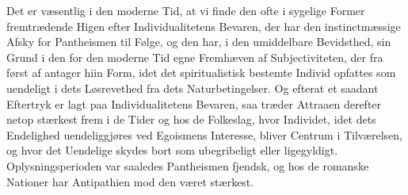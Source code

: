 Det er væsentlig i den moderne Tid, at vi finde den ofte i sygelige Former
fremtrædende Higen efter Individualitetens Bevaren, der har den
instinctmæssige Afsky for Pantheismen til Følge, og den har, i den umiddelbare
Bevidsthed, sin Grund i den for den moderne Tid egne Fremhæven af
Subjectiviteten, der fra først af antager hiin Form, idet det spiritualistisk
bestemte Individ opfattes som uendeligt i dets Løsrevethed fra dets
Naturbetingelser. Og efterat et saadant Eftertryk er lagt paa Individualitetens
Bevaren, saa træder Attraaen derefter netop stærkest frem i de Tider og hos de
Folkeslag, hvor Individet, idet dets Endelighed uendeliggjøres ved Egoismens
Interesse, bliver Centrum i Tilværelsen, og hvor det Uendelige skydes bort som
ubegribeligt eller ligegyldigt. Oplysningsperioden var saaledes Pantheismen
fjendsk, og hos de romanske Nationer har Antipathien mod den været stærkest.

